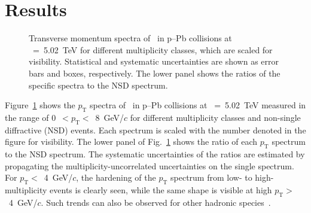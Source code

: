 
\section {Results}
\label{sec:results}

\begin{figure}[!hbt]
	\centering
	\caption{ Transverse momentum spectra of \fzero~in p--Pb collisions at \snn~=~5.02~TeV for different multiplicity classes, which are scaled for visibility. Statistical and systematic uncertainties are shown as error bars and boxes, respectively. The lower panel shows the ratios of the specific spectra to the NSD spectrum. }
	\label{fig:pt}
\end{figure}

Figure~\ref{fig:pt} shows the $p_{\mathrm{T}}$ spectra of \fzero~in p--Pb collisions at \snn~=~5.02~TeV measured in the range of 0~$<p_{\mathrm{T}}<$~8~GeV/$c$ for different multiplicity classes and non-single diffractive (NSD) events. Each spectrum is scaled with the number denoted in the figure for visibility. The lower panel of Fig.~\ref{fig:pt} shows the ratio of each $p_{\mathrm{T}}$ spectrum to the NSD spectrum. The systematic uncertainties of the ratios are estimated by propagating the multiplicity-uncorrelated uncertainties on the single spectrum. For $p_{\mathrm{T}}<$~4~GeV/$c$, the hardening of the $p_{\mathrm{T}}$ spectrum from low- to high-multiplicity events is clearly seen, while the same shape is visible at high $p_{\mathrm{T}}>$~4~GeV/$c$. Such trends can also be observed for other hadronic species~\cite{Tsallis:1987eu}.

